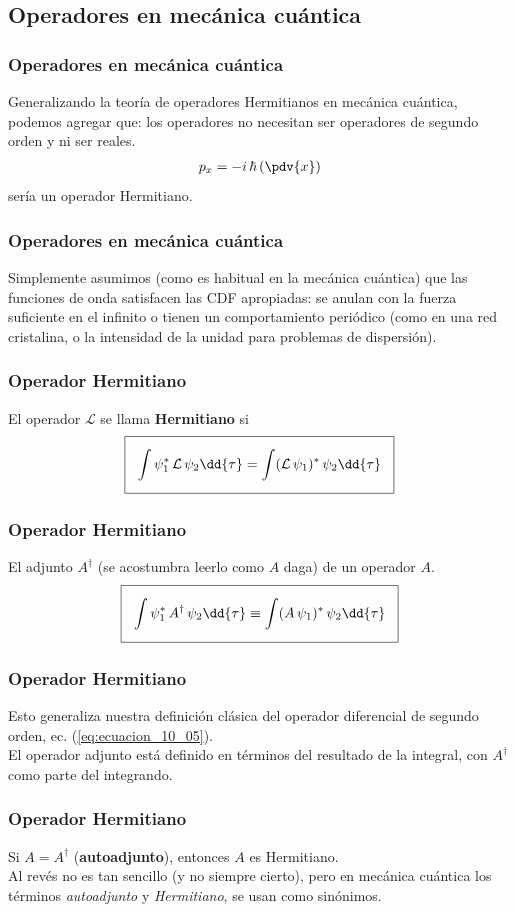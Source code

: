 \subsection{Operadores en mecánica cuántica}
\begin{frame}
\frametitle{Operadores en mecánica cuántica}
Generalizando la teoría de operadores Hermitianos en mecánica cuántica, podemos agregar que: los operadores no necesitan ser operadores de segundo orden y ni ser reales. 
\begin{align*}
p_{x} = - i \, \hbar \left(\pdv{x}\right)
\end{align*}
sería un operador Hermitiano.
\end{frame}
\begin{frame}
\frametitle{Operadores en mecánica cuántica}
Simplemente asumimos (como es habitual en la mecánica cuántica) que las funciones de onda satisfacen las CDF apropiadas: se anulan con la fuerza suficiente en el infinito o tienen un comportamiento periódico (como en una red cristalina, o la intensidad de la unidad para problemas de dispersión). 
\end{frame}
\begin{frame}
\frametitle{Operador Hermitiano}
El operador $\mathcal{L}$ se llama \textbf{Hermitiano} si
\begin{align}
\setlength{\fboxsep}{3\fboxsep}\boxed{\int \psi_{1}^{*} \, \mathcal{L} \, \psi_{2} \dd{\tau} =  \int (\mathcal{L} \, \psi_{1})^{*} \, \psi_{2} \dd{\tau}}
\label{eq:ecuacion_10_26}
\end{align}
\end{frame}
\begin{frame}
\frametitle{Operador Hermitiano}
El adjunto $A^{\dagger}$ (se acostumbra leerlo como $A$ daga) de un operador $A$.
\begin{align}
\setlength{\fboxsep}{3\fboxsep}\boxed{\int \psi_{1}^{*} \, A^{\dagger} \, \psi_{2} \dd{\tau} \equiv \int (A \, \psi_{1})^{*} \, \psi_{2} \dd{\tau}}
\label{eq:ecuacion_10_27}
\end{align}
\end{frame}
\begin{frame}
\frametitle{Operador Hermitiano}
Esto generaliza nuestra definición clásica del operador diferencial de segundo orden, ec. (\ref{eq:ecuacion_10_05}). 
\\
\bigskip
\pause
El operador adjunto está definido en términos del resultado de la integral, con $A^{\dagger}$ como parte del integrando. 
\end{frame}
\begin{frame}
\frametitle{Operador Hermitiano}
Si $A = A^{\dagger}$ (\textbf{autoadjunto}), entonces $A$ es Hermitiano.
\\
\bigskip
\pause
Al revés no es tan sencillo (y no siempre cierto), pero en mecánica cuántica los términos \emph{autoadjunto} y \emph{Hermitiano}, se usan como sinónimos.
\end{frame}
